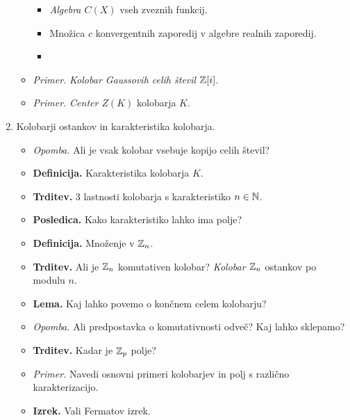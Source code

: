 \begin{enumerate}
\begin{itemize}
\begin{itemize}
            \item \emph{Algebra $C(X)$} vseh zveznih funkcij.
            \item Množica $c$ konvergentnih zaporedij v algebre realnih zaporedij.
            \item 
        \end{itemize}
        \item \colorbox{yellow!30}{\emph{Primer.}} \emph{Kolobar Gaussovih celih števil $\mathbb{Z}[i]$}.
        \item \colorbox{yellow!30}{\emph{Primer.}} \emph{Center $Z(K)$} kolobarja $K$.
    \end{itemize}

    \newpage
    \item Kolobarji ostankov in karakteristika kolobarja.
    \begin{itemize}
        \item \colorbox{yellow!30}{\emph{Opomba.}}  Ali je vsak kolobar vsebuje kopijo celih števil?
        \item \colorbox{purple!30}{\textbf{Definicija.}} Karakteristika kolobarja $K$.
        \item \colorbox{blue!30}{\textbf{Trditev.}} 3 lastnosti kolobarja s karakteristiko $n \in \mathbb{N}$.
        \item \colorbox{orange!30}{\textbf{Posledica.}} Kako karakteristiko lahko ima polje?
        \item \colorbox{purple!30}{\textbf{Definicija.}} Množenje v $\mathbb{Z}_n$.
        \item \colorbox{blue!30}{\textbf{Trditev.}} Ali je $\mathbb{Z}_n$ komutativen kolobar? \emph{Kolobar $\mathbb{Z}_n$} ostankov po modulu $n$.
        \item \colorbox{blue!30}{\textbf{Lema.}} Kaj lahko povemo o končnem celem kolobarju?
        \item \colorbox{yellow!30}{\emph{Opomba.}} Ali predpostavka o komutativnosti odveč? Kaj lahko sklepamo?
        \item \colorbox{blue!30}{\textbf{Trditev.}} Kadar je $\mathbb{Z}_p$ polje?
        \item \colorbox{yellow!30}{\emph{Primer.}} Navedi osnovni primeri kolobarjev in polj s različno karakterizacijo.
        \item \colorbox{blue!30}{\textbf{Izrek.}} Vali Fermatov izrek. 
    \end{itemize}


\end{enumerate}
